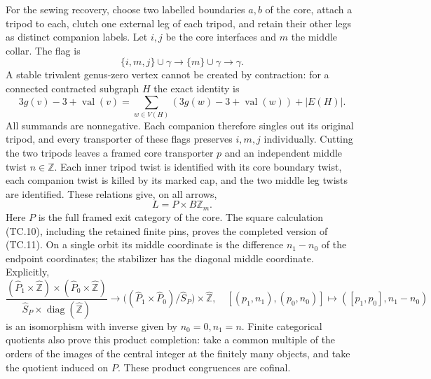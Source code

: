 For the sewing recovery, choose two labelled boundaries $a,b$ of the
core, attach a tripod to each, clutch one external leg of each tripod,
and retain their other legs as distinct companion labels.  Let $i,j$
be the core interfaces and $m$ the middle collar.  The flag is
\[
 \{i,m,j\}\cup\gamma\longrightarrow\{m\}\cup\gamma
                                      \longrightarrow\gamma.
\]
A stable trivalent genus-zero vertex cannot be created by contraction:
for a connected contracted subgraph $H$ the exact identity is
\[
3g(v)-3+\operatorname{val}(v)
 =\sum_{w\in V(H)}(3g(w)-3+\operatorname{val}(w))+|E(H)|.
\]
All summands are nonnegative.  Each companion therefore singles out
its original tripod, and every transporter of these flags preserves
$i,m,j$ individually.  Cutting the two tripods leaves a framed core
transporter $p$ and an independent middle twist $n\in\mathbb Z$.
Each inner tripod twist is identified with its core boundary twist,
each companion twist is killed by its marked cap, and the two middle
leg twists are identified.  These relations give, on all arrows,
\[
                         L=P\times B\mathbb Z_m.            \tag{TC.11}
\]
Here $P$ is the full framed exit category of the core.
The square calculation (TC.10), including the retained finite pins,
proves the completed version of (TC.11).  On a single orbit its middle
coordinate is the difference $n_1-n_0$ of the endpoint coordinates;
the stabilizer has the diagonal middle coordinate.  Explicitly,
\[
 \frac{(\widehat P_1\times\widehat{\mathbb Z})
                  \times(\widehat P_0\times\widehat{\mathbb Z})}
      {\widehat S_P\times\operatorname{diag}(\widehat{\mathbb Z})}
 \longrightarrow
 \bigl((\widehat P_1\times\widehat P_0)/\widehat S_P\bigr)
                          \times\widehat{\mathbb Z},
\quad[(p_1,n_1),(p_0,n_0)]\mapsto([p_1,p_0],n_1-n_0)
\]
is an isomorphism with inverse given by $n_0=0,n_1=n$.
Finite categorical quotients also prove this product completion:
take a common multiple of the orders of the images of the central
integer at the finitely many objects, and take the quotient induced
on $P$.  These product congruences are cofinal.


